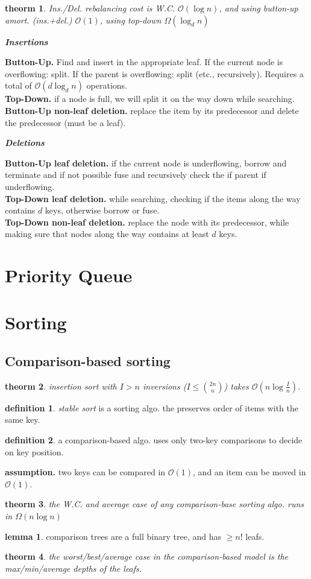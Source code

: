 \documentclass[]{article}
\newcommand\oc    {\mathcal{O}}
\newcommand\logn      {\log n}
\newcommand\cl [1]    {\left ( #1 \right )}
\newtheorem{Theorem}{theorm}
\theoremstyle{definition}
\newtheorem{Definition}{definition}
\newtheorem{Lemma}{lemma}
\newcommand\theo  [1] {\begin{Theorem}#1\end{Theorem}}
\newcommand\defi  [1] {\begin{Definition}#1\end{Definition}}
\newcommand\lem   [1] {\begin{Lemma}#1\end{Lemma}}
\begin{document}
\begin{multicols}{4}
		\theo{Ins./Del. rebalancing cost is W.C. $\oc(\logn)$, and using button-up amort. (ins.+del.) $\oc(1)$, using top-down $\Omega(\log_dn)$}
		
		\quad\textbf{\textit{Insertions}}
		
		\textbf{Button-Up. }Find and insert in the appropriate leaf. If the current node is overflowing: split. If the parent is overflowing: split (etc., recursively). Requires a total of $\oc(d \log_dn)$ operations. \\
		\textbf{Top-Down. }if a node is full, we will split it on the way down while searching. \\
		\textbf{Button-Up non-leaf deletion. }replace the item by its predecessor and delete the predecessor (must be a leaf). 
		
		\quad\textbf{\textit{Deletions}}
		
		\textbf{Button-Up leaf deletion. }if the current node is underflowing, borrow and terminate and if not possible fuse and recursively check the if parent if underflowing. \\
		\textbf{Top-Down leaf deletion. }while searching, checking if the items along the way contains $d$ keys, otherwise borrow or fuse. \\
		\textbf{Top-Down non-leaf deletion. }replace the node with its predecessor, while making sure that nodes along the way contains at least $d$ keys. 
		
		\section{Priority Queue}
		
		\section{Sorting}
		\subsection{Comparison-based sorting}
		\theo{insertion sort with $I > n$ inversions ($I \le \binom{2n}{n}$) takes $\oc\cl{n \log \frac{I}{n}}$. }
		\defi{\textit{stable sort} is a sorting algo. the preserves order of items with the same key. }
		\defi{a comparison-based algo. uses only two-key comparisons to decide on key position. }
		\textbf{assumption. }two keys can be compared in $\oc(1)$, and an item can be moved in $\oc(1)$. 
		\theo{the W.C. and average case of any comparison-base sorting algo. runs in $\Omega(n \logn)$}
		\lem{comparison trees are a full binary tree, and has $\ge n!$ leafs. }
		\theo{the worst/best/average case in the comparison-based model is the max/min/average depths of the leafs. }
		

\end{multicols}
\end{document}
